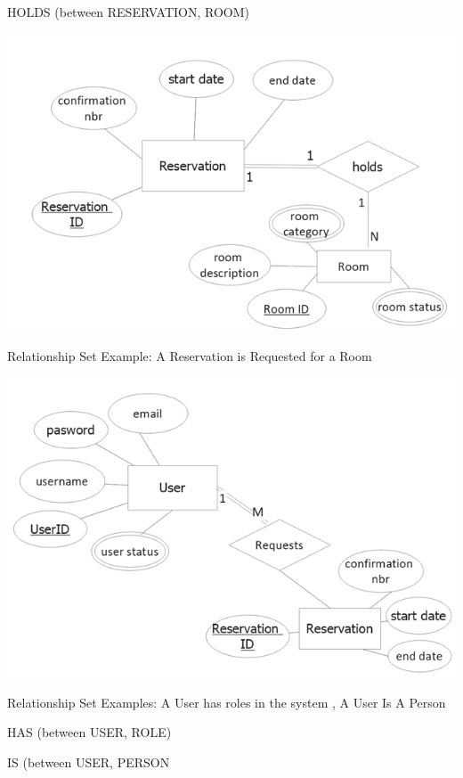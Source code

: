 \documentclass[11pt]{report}
\begin{document}
\setlength{\parindent}{5ex}
 
 HOLDS (between RESERVATION, ROOM)
 
\begin{center}
\includegraphics{resv_holds_room.PNG}
\end{center}

Relationship Set Example: A Reservation is Requested for a Room

\begin{center}
\includegraphics{user_requests_resv.PNG}
\end{center}

\pagebreak
Relationship Set Examples: 
A User has roles in the system , A User Is A Person

HAS (between USER, ROLE)

IS (between USER, PERSON
\end{document}

